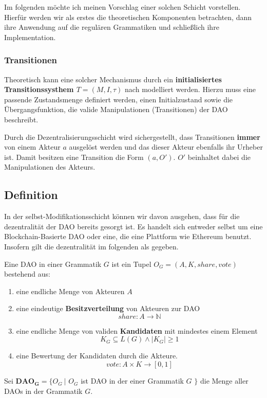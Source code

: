 \documentclass[]{article}
\begin{document}
Im folgenden möchte ich meinen Vorschlag einer solchen Schicht vorstellen. Hierfür werden wir als erstes die theoretischen Komponenten betrachten, dann ihre Anwendung auf die regulären Grammatiken und schließlich ihre Implementation.

\subsubsection*{Transitionen}
Theoretisch kann eine solcher Mechanismus durch ein \textbf{initialisiertes Transitionssysthem $T=(M,I,\tau)$} nach \cite{Glausch} modelliert werden. Hierzu muss eine passende Zustandsmenge definiert werden, einen Initialzustand sowie die Übergangsfunktion, die valide Manipulationen (Transitionen) der DAO beschreibt.

Durch die Dezentralisierungsschicht wird sichergestellt, dass Transitionen \textbf{immer} von einem Akteur $a$ ausgelöst werden und das dieser Akteur ebenfalls ihr Urheber ist. Damit besitzen eine Transition die Form $(a, O')$. $O'$ beinhaltet dabei die Manipulationen des Akteurs.


\subsection{Definition}
In der selbst-Modifikationsschicht können wir davon ausgehen, dass für die dezentralität der DAO bereits gesorgt ist. Es handelt sich entweder selbst um eine Blockchain-Basierte DAO oder eine, die eine Plattform wie Ethereum benutzt. Insofern gilt die dezentralität im folgenden als gegeben.

Eine DAO in einer Grammatik $G$ ist ein Tupel $O_G=(A, K, share, vote)$ bestehend aus:

\begin{enumerate}
\item eine endliche Menge von Akteuren $A$
\item eine eindeutige \textbf{Besitzverteilung} von Akteuren zur DAO
  \[share: A \rightarrow \mathbb{N}\]
\item eine endliche Menge von validen \textbf{Kandidaten} mit mindestes einem Element 
  \[K_G \subseteq L(G) \land |K_G| \geq 1\] 
\item eine Bewertung der Kandidaten durch die Akteure. 
  \[vote: A\times K \rightarrow [0,1]\]
\end{enumerate}

Sei $\mathbf{DAO_G} = \{ O_G\ |$ $O_G$ ist DAO in der einer Grammatik $G$ $\}$ die Menge aller DAOs in der Grammatik $G$.
\end{document}
